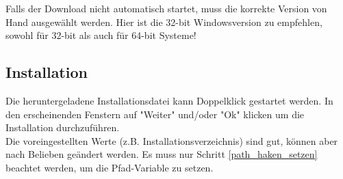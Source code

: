 \documentclass[ngerman,oneside, a4letter]{article}
\begin{document}
\noindent Falls der Download nicht automatisch startet, muss die korrekte Version von Hand ausgewählt werden. Hier ist die 32-bit Windowsversion zu empfehlen, sowohl für 32-bit als auch für 64-bit Systeme!
\begin{center}
\end{center}

\clearpage

\subsection{Installation}
Die heruntergeladene Installationsdatei kann Doppelklick gestartet werden. In den erscheinenden Fenstern auf "Weiter" und/oder "Ok" klicken um die Installation durchzuführen.
\\Die voreingestellten Werte (z.B. Installationsverzeichnis) sind gut, können aber nach Belieben geändert werden. Es muss nur Schritt \ref{path_haken_setzen} beachtet werden, um die Pfad-Variable zu setzen.

\begin{center}
\end{center}
\end{document}
